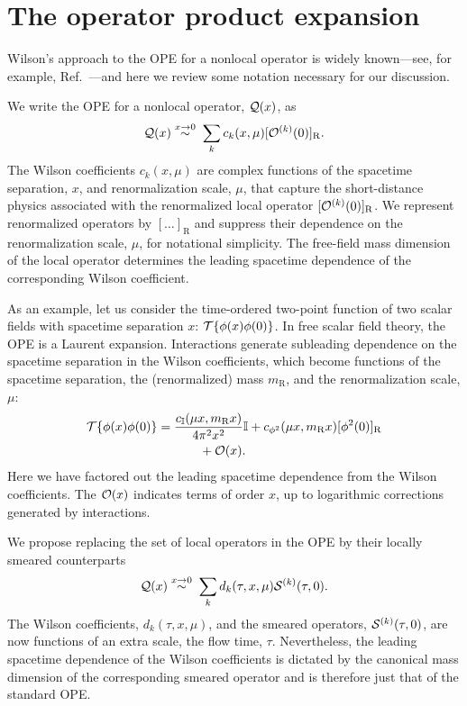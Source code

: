 \section{\label{sec:ope}The operator product expansion}

Wilson's approach to the OPE for a nonlocal operator is widely known---see, for 
example, Ref.~\cite{Collins:1984rdg}---and here we review some notation 
necessary for our discussion.

We write the OPE for a nonlocal operator, ${\cal Q}(x)$, as
\begin{equation}
{\cal Q}(x)  \stackrel{x\rightarrow 0}{\sim} \; \sum_k 
c_k(x,\mu) [{\cal O}^{(k)}(0)]_{\mathrm{R}}.
\end{equation}
The Wilson coefficients $c_k(x,\mu)$ are complex functions of the spacetime 
separation, $x$, and renormalization scale, $\mu$, that capture the 
short-distance physics associated with the renormalized local operator $[{\cal 
O}^{(k)}(0)]_{\mathrm{R}}$. We represent renormalized operators by 
$[\ldots]_{\mathrm{R}}$ and suppress their dependence on the renormalization 
scale, $\mu$, for notational simplicity. The 
free-field mass dimension of the local operator determines the leading 
spacetime dependence of the corresponding Wilson coefficient.

As an example, let us consider the time-ordered two-point function of two 
scalar fields with spacetime separation $x$: ${\cal T} \{\phi(x)\phi(0)\}$. In 
free scalar field theory, 
the OPE is a Laurent expansion. Interactions generate subleading dependence 
on the spacetime separation in the Wilson coefficients, which become 
functions of the spacetime separation, the (renormalized) mass 
$m_{\mathrm{R}}$, and the 
renormalization scale, $\mu$:
\begin{align}\label{eq:opeint}
{\cal T} \{\phi(x)\phi(0)\} = {}& \frac{c_{\mathbb{I}}(\mu 
x,m_{\mathrm{R}}x)}{4\pi^2x^2}\mathbb{I}+ 
c_{\phi^2}(\mu x,m_{\mathrm{R}}x)[\phi^2(0) ]_{\mathrm{R}} \nonumber\\
{} & \qquad 
+{\cal O}(x).
\end{align}
Here we have 
factored 
out 
the leading spacetime dependence from the Wilson 
coefficients. The ${\cal O}(x)$ indicates terms of order $x$, up to 
logarithmic corrections generated by interactions.

We propose replacing the set of local operators in the OPE by
their locally smeared counterparts
\begin{equation}
{\cal Q}(x)  \stackrel{x\rightarrow 0}{\sim} \; \sum_k 
d_k(\tau,x,\mu) {\cal S}^{(k)}(\tau,0).
\end{equation}
The Wilson coefficients, $d_k(\tau,x,\mu)$, and the smeared 
operators, ${\cal S}^{(k)}(\tau,0)$, are now functions of an extra 
scale, the 
flow time, $\tau$. Nevertheless, the leading spacetime 
dependence of the Wilson coefficients is dictated by the canonical mass 
dimension of the corresponding smeared operator
and is therefore just that of the standard OPE. 

